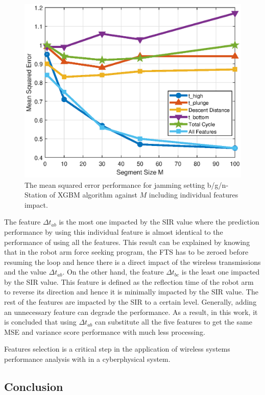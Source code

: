 \begin{figure}[!ht]
	\centering
	\includegraphics[width=0.75\columnwidth]{./chapter-ftml/plots/004_MSE_F_3.eps}
	\caption{The mean squared error performance for jamming setting b/g/n-Station of XGBM algorithm against $M$ including individual features impact.}
	\label{ftml-jrnl:fig:004_MSE_F_3}      
\end{figure}

The feature $\Delta{t}_{ab}$ is the most one impacted by the SIR value where the prediction performance by using this individual feature is almost identical to the performance of using all the features. This result can be explained by knowing that in the robot arm force seeking program, the FTS has to be zeroed before resuming the loop and hence there is a direct impact of the wireless transmissions and the value $\Delta{t}_{ab}$. On the other hand, the feature $\Delta{t}_{bc}$ is the least one impacted by the SIR value. This feature is defined as the reflection time of the robot arm to reverse its direction and hence it is minimally impacted by the SIR value. The rest of the features are impacted by the SIR to a certain level. Generally, adding an unnecessary feature can degrade the performance. As a result, in this work, it is concluded that using $\Delta{t}_{ab}$ can substitute all the five features to get the same MSE and variance score performance with much less processing.

\begin{emphbox}
	Features selection is a critical step in the application of wireless systems performance analysis with in a cyberphysical system.
\end{emphbox}

\subsection{Conclusion}\label{ftml-jrnl:sec:conclusion}

